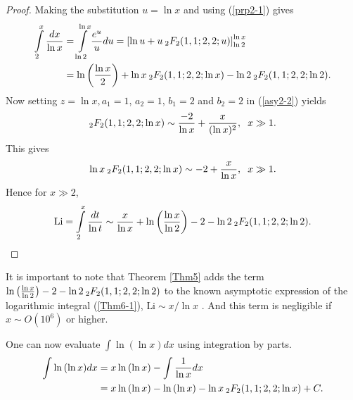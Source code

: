 \documentclass[smallextended]{svjour3}
\begin{document}
\begin{proof}
Making the substitution $u=\ln{x}$ and using (\ref{prp2-1}) gives
\begin{align}
\int\limits_{2}^{x}\frac{dx}{\ln{x}}&=\int\limits_{\ln2}^{\ln{x}}\frac{e^u}{u}du=\left[\ln{u}+u\hspace{.075cm} _{2}F_{2}(1,1;2,2;u)\right]_{\ln2}^{\ln{x}}
\nonumber\\ & =\ln{\left(\frac{\ln{x}}{2}\right)}+\ln{x}\hspace{.075cm} _{2}F_{2}(1,1;2,2;\ln{x})-
\ln{2}\hspace{.075cm} _{2}F_{2}(1,1;2,2;\ln{2}).
\end{align}
Now setting $z=\ln{x}, a_1=1$, $a_2=1$, $b_1=2$ and $b_2=2$ in (\ref{asy2-2}) yields
\begin{equation}
_{2}F_{2}(1,1;2,2;\ln{x})\sim\frac{-2}{\ln{x}}+\frac{x}{(\ln{x})^2}, \hspace{.2cm} x\gg1.
\end{equation}
This gives
\begin{equation}
\ln{x}\hspace{.075cm} _{2}F_{2}(1,1;2,2;\ln{x})\sim-2+\frac{x}{\ln{x}}, \hspace{.2cm} x\gg1.
\end{equation}
Hence for $x\gg2$,
\begin{equation}
\text{Li}=\int\limits_{2}^{x}\frac{dt}{\ln{t}}\sim \frac{x}{\ln{x}}+\ln{\left(\frac{\ln{x}}{\ln{2}}\right)}-2-
\ln{2}\hspace{.075cm} _{2}F_{2}(1,1;2,2;\ln{2}).
\end{equation}
\end{proof}
It is important to note that Theorem \ref{Thm5} adds the term $\ln{\left(\frac{\ln{x}}{\ln{2}}\right)}-2-
\ln{2}\hspace{.075cm} _{2}F_{2}(1,1;2,2;\ln{2})$ to the known asymptotic expression of the logarithmic integral (\ref{Thm6-1}), $\text{Li}\sim {x}/{\ln{x}}$ \cite{AS,ND}. And this term is negligible if $x\sim O(10^6)$ or higher.

\begin{example} One can now evaluate $\int \ln{(\ln{x})} dx$ using integration by parts.
\begin{align}
\int \ln{(\ln{x})} dx&=x\ln{(\ln{x})}-\int \frac{1}{\ln{x}} dx
\nonumber \\ &=x\ln{(\ln{x})}-\ln{(\ln{x})}-\ln{x}\hspace{.075cm} _{2}F_{2}(1,1;2,2;\ln{x})+C.
\label{ex7-1}
\end{align}
\label{ex7}
\end{example}
\end{document}
